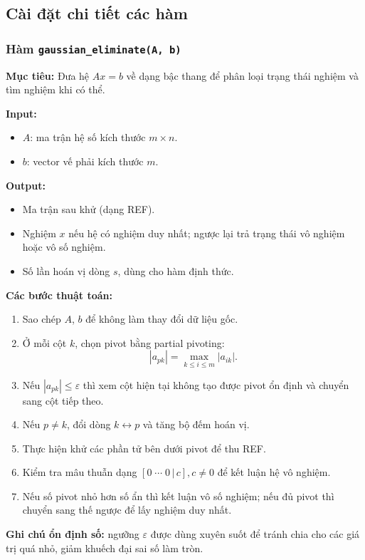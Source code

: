 \documentclass[a4paper]{article}
\begin{document}
\subsection{Cài đặt chi tiết các hàm}

\subsubsection{Hàm \texttt{gaussian\_eliminate(A, b)}}
\textbf{Mục tiêu:} Đưa hệ \(Ax=b\) về dạng bậc thang để phân loại trạng thái nghiệm và tìm nghiệm khi có thể.

\textbf{Input:}
\begin{itemize}
    \item \(A\): ma trận hệ số kích thước \(m\times n\).
    \item \(b\): vector vế phải kích thước \(m\).
\end{itemize}

\textbf{Output:}
\begin{itemize}
    \item Ma trận sau khử (dạng REF).
    \item Nghiệm \(x\) nếu hệ có nghiệm duy nhất; ngược lại trả trạng thái vô nghiệm hoặc vô số nghiệm.
    \item Số lần hoán vị dòng \(s\), dùng cho hàm định thức.
\end{itemize}

\textbf{Các bước thuật toán:}
\begin{enumerate}
    \item Sao chép \(A\), \(b\) để không làm thay đổi dữ liệu gốc.
    \item Ở mỗi cột \(k\), chọn pivot bằng partial pivoting:
    \[
    |a_{pk}| = \max_{k \le i \le m} |a_{ik}|.
    \]
    \item Nếu \(|a_{pk}|\le\varepsilon\) thì xem cột hiện tại không tạo được pivot ổn định và chuyển sang cột tiếp theo.
    \item Nếu \(p\neq k\), đổi dòng \(k\leftrightarrow p\) và tăng bộ đếm hoán vị.
    \item Thực hiện khử các phần tử bên dưới pivot để thu REF.
    \item Kiểm tra mâu thuẫn dạng \([0\;\cdots\;0\,|\,c], c\neq 0\) để kết luận hệ vô nghiệm.
    \item Nếu số pivot nhỏ hơn số ẩn thì kết luận vô số nghiệm; nếu đủ pivot thì chuyển sang thế ngược để lấy nghiệm duy nhất.
\end{enumerate}

\textbf{Ghi chú ổn định số:} ngưỡng \(\varepsilon\) được dùng xuyên suốt để tránh chia cho các giá trị quá nhỏ, giảm khuếch đại sai số làm tròn.
\end{document}
